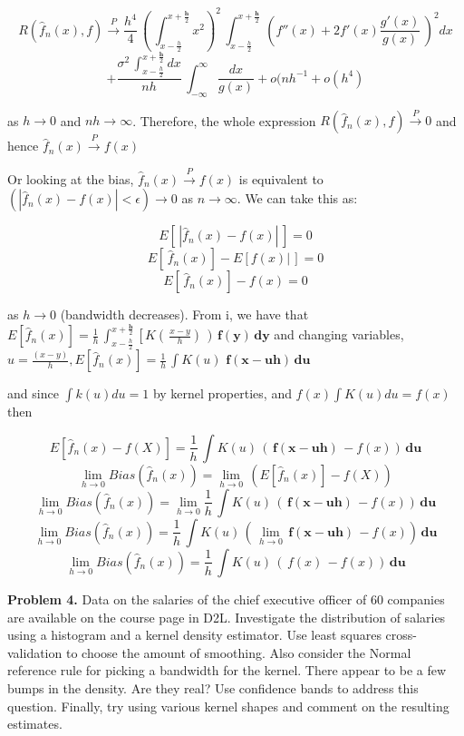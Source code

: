 \documentclass[11pt]{report}
\begin{document}
\begin{itemize}
$$ R(\widehat{f}_n(x),f) \xrightarrow{P} \frac{h^4}{4}\,\left(\,\int_{x-\frac{h}{2}}^{x +\frac{\mathbf{h}}{2}}x^2\right)^{2}\,\int_{x-\frac{h}{2}}^{x +\frac{\mathbf{h}}{2}}\,\left(f''(x) + 2f'(x)\frac{g'(x)}{g(x)}\,\right)^{2}dx $$
$$+ \frac{\sigma^{2}\,\int_{x-\frac{h}{2}}^{x +\frac{\mathbf{h}}{2}}dx}{nh}\,\int_{-\infty}^{\infty}\frac{dx}{g(x)} + o(nh^{-1} + o(h^{4}) $$

as $h \rightarrow 0$ and $nh \rightarrow \infty$. Therefore, the whole expression $ R(\widehat{f}_n(x),f) \xrightarrow{P} 0 $ and hence $\widehat{f}_n(x) \xrightarrow{P} f(x)$

Or looking at the bias, $\widehat{f}_n(x) \xrightarrow{P} f(x)$ is equivalent to $(|\widehat{f}_n(x) - f(x)| < \epsilon) \rightarrow 0$  as $n \rightarrow \infty$. We can take this as:

$$ E\left[\,|\widehat{f}_n(x) - f(x)|\,\right] = 0$$
$$ E\left[\,\widehat{f}_n(x)\right] - E\left[f(x)|\,\right] = 0$$
$$ E\left[\,\widehat{f}_n(x)\right] - f(x) = 0$$

as $h \rightarrow 0$ (bandwidth decreases). From i, we have that $ E\left[\widehat{f}_n(x) \right] = \frac{1}{h}\,\int_{x-\frac{h}{2}}^{x +\frac{\mathbf{h}}{2}} \left[K(\,\frac{x-y}{h})\,\right)\,\mathbf{f(y)}\,\mathbf{dy}$ and changing variables, $ u = \frac{(x - y)}{h}, E\left[\widehat{f}_n(x) \right] = \frac{1}{h}\,\int K(u)\,\,\mathbf{f(x-uh)}\,\mathbf{du}$

and since $\int k(u) du = 1$ by kernel properties, and $f(x) \int K(u) du = f(x) $ then

$$ E\left[\widehat{f}_n(x) - f(X)\right] = \frac{1}{h}\,\int K(u)\,\left(\,\mathbf{f(x-uh)}\,- f(x)\right)\,\mathbf{du}$$
$$ \lim_{h \to 0} Bias(\widehat{f}_n(x)) = \lim_{h \to 0}\,\left(E\left[\widehat{f}_n(x)\right] - f(X)\right)$$
$$ \lim_{h \to 0} Bias(\widehat{f}_n(x)) = \lim_{h \to 0} \frac{1}{h}\,\int K(u)\,\left(\,\mathbf{f(x-uh)}\,- f(x)\right)\,\mathbf{du}$$
$$ \lim_{h \to 0} Bias(\widehat{f}_n(x)) = \frac{1}{h}\,\int K(u)\,\left(\,\lim_{h \to 0} \,\mathbf{f(x-uh)}\,- f(x)\right)\,\mathbf{du}$$
$$ \lim_{h \to 0} Bias(\widehat{f}_n(x)) = \frac{1}{h}\,\int K(u)\,\left(\,f(x)\,- f(x)\right)\,\mathbf{du}$$

\end{itemize}

\noindent
\newpage 
{\bf Problem 4.} Data on the salaries of the chief executive officer of 60 companies are available on the course page in D2L. 
Investigate the distribution of salaries using a histogram and a kernel density estimator. Use least squares cross-validation to choose the amount of smoothing. Also consider the Normal reference rule for picking a bandwidth for the kernel. There appear to be a few bumps in the density. Are they real? Use confidence bands to address this question. Finally, try using various kernel shapes and comment on the resulting estimates. 
\end{document}
